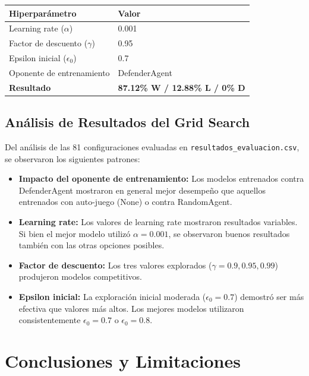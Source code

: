 \documentclass[11pt,a4paper]{article}
\begin{document}
\begin{center}
\begin{tabular}{ll}
\toprule
\textbf{Hiperparámetro} & \textbf{Valor} \\
\midrule
Learning rate ($\alpha$) & 0.001 \\
Factor de descuento ($\gamma$) & 0.95 \\
Epsilon inicial ($\epsilon_0$) & 0.7 \\
Oponente de entrenamiento & DefenderAgent \\
\midrule
\textbf{Resultado} & \textbf{87.12\% W / 12.88\% L / 0\% D} \\
\bottomrule
\end{tabular}
\end{center}

\subsection{Análisis de Resultados del Grid Search}

Del análisis de las 81 configuraciones evaluadas en \texttt{resultados\_evaluacion.csv}, se observaron los siguientes patrones:

\begin{itemize}
    \item \textbf{Impacto del oponente de entrenamiento:} Los modelos entrenados contra DefenderAgent mostraron en general mejor desempeño que aquellos entrenados con auto-juego (None) o contra RandomAgent.

    \item \textbf{Learning rate:} Los valores de learning rate mostraron resultados variables. Si bien el mejor modelo utilizó $\alpha=0.001$, se observaron buenos resultados también con las otras opciones posibles. 

    \item \textbf{Factor de descuento:} Los tres valores explorados ($\gamma=0.9, 0.95, 0.99$) produjeron modelos competitivos.

    \item \textbf{Epsilon inicial:} La exploración inicial moderada ($\epsilon_0=0.7$) demostró ser más efectiva que valores más altos. Los mejores modelos utilizaron consistentemente $\epsilon_0=0.7$ o $\epsilon_0=0.8$.

\end{itemize}


\section{Conclusiones y Limitaciones}
\end{document}
